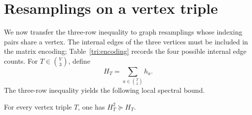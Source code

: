 \section{Resamplings on a vertex triple}\label{tri:section}

We now transfer the three-row inequality to graph resamplings whose
indexing pairs share a vertex. The internal edges of the three vertices
must be included in the matrix encoding; Table~\ref{tri:encoding}
records the four possible internal edge counts.
For $T\in\binom V3$, define
\[
 H_T=\sum_{a\in\binom T2}h_a.
\]
The three-row inequality yields the following local spectral bound.

\begin{proposition}\label{tri:gap}
For every vertex triple $T$, one has $H_T^2\succeq H_T$.
\end{proposition}
